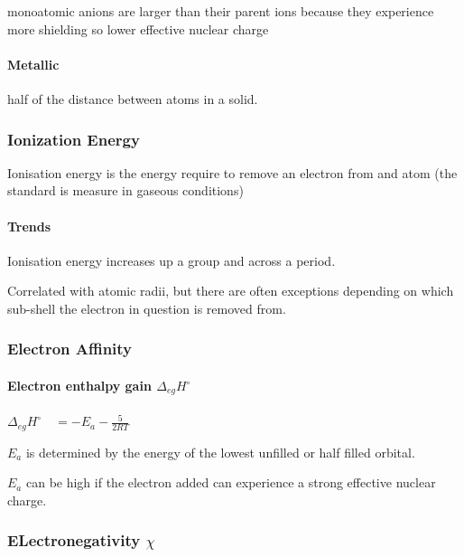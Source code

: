 \documentclass[]{article}
\let\oldparagraph\paragraph
\renewcommand{\paragraph}[1]{\oldparagraph{#1}\mbox{}}
\begin{document}
monoatomic anions are larger than their parent ions because they
experience more shielding so lower effective nuclear charge

\paragraph{Metallic}\label{metallic}

half of the distance between atoms in a solid.

\subsubsection{Ionization Energy}\label{ionization-energy}

Ionisation energy is the energy require to remove an electron from and
atom (the standard is measure in gaseous conditions)

\paragraph{Trends}\label{trends-2}

Ionisation energy increases up a group and across a period.

Correlated with atomic radii, but there are often exceptions depending
on which sub-shell the electron in question is removed from.

\subsubsection{Electron Affinity}\label{electron-affinity}

\paragraph{\texorpdfstring{Electron enthalpy gain
\(\Delta_{eg}H^{\circ}\quad\)}{Electron enthalpy gain \textbackslash{}Delta\_\{eg\}H\^{}\{\textbackslash{}circ\}\textbackslash{}quad}}\label{electron-enthalpy-gain-delta_eghcircquad}

\(\Delta_{eg}H^{\circ}\quad=-E_{a}-\frac{5}{2RT}\)

\(E_a\) is determined by the energy of the lowest unfilled or half
filled orbital.

\(E_a\) can be high if the electron added can experience a strong
effective nuclear charge.

\subsubsection{\texorpdfstring{ELectronegativity
\(\chi\quad\)}{ELectronegativity \textbackslash{}chi\textbackslash{}quad}}\label{electronegativity-chiquad}
\end{document}
